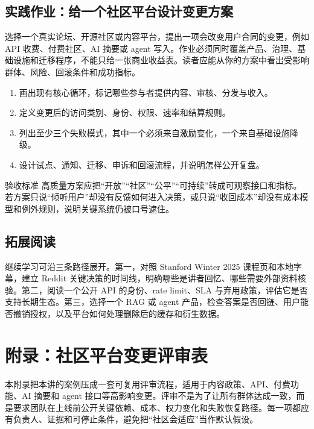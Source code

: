 \documentclass[a4paper]{article}
\begin{document}
\subsection{实践作业：给一个社区平台设计变更方案}

选择一个真实论坛、开源社区或内容平台，提出一项会改变用户合同的变更，例如 API 收费、付费社区、AI 摘要或 agent 写入。作业必须同时覆盖产品、治理、基础设施和迁移程序，不能只给一张商业收益表。读者应能从你的方案中看出受影响群体、风险、回滚条件和成功指标。

\begin{enumerate}
  \item 画出现有核心循环，标记哪些参与者提供内容、审核、分发与收入。
  \item 定义变更后的访问类别、身份、权限、速率和结算规则。
  \item 列出至少三个失败模式，其中一个必须来自激励变化，一个来自基础设施降级。
  \item 设计试点、通知、迁移、申诉和回滚流程，并说明怎样公开复盘。
\end{enumerate}

\begin{knowledgebox}{验收标准}
高质量方案应把“开放”“社区”“公平”“可持续”转成可观察接口和指标。若方案只说“倾听用户”却没有反馈如何进入决策，或只说“收回成本”却没有成本模型和例外规则，说明关键系统仍被口号遮住。
\end{knowledgebox}

\subsection{拓展阅读}

继续学习可沿三条路径展开。第一，对照 Stanford Winter 2025 课程页和本地字幕，建立 Reddit 关键决策的时间线，明确哪些是讲者回忆、哪些需要外部资料核验。第二，阅读一个公开 API 的身份、rate limit、SLA 与弃用政策，评估它是否支持长期生态。第三，选择一个 RAG 或 agent 产品，检查答案是否回链、用户能否撤销授权，以及平台如何处理删除后的缓存和衍生数据。

\section{附录：社区平台变更评审表}

本附录把本讲的案例压成一套可复用评审流程，适用于内容政策、API、付费功能、AI 摘要和 agent 接口等高影响变更。评审不是为了让所有群体达成一致，而是要求团队在上线前公开关键依赖、成本、权力变化和失败恢复路径。每一项都应有负责人、证据和可停止条件，避免把“社区会适应”当作默认假设。
\end{document}

